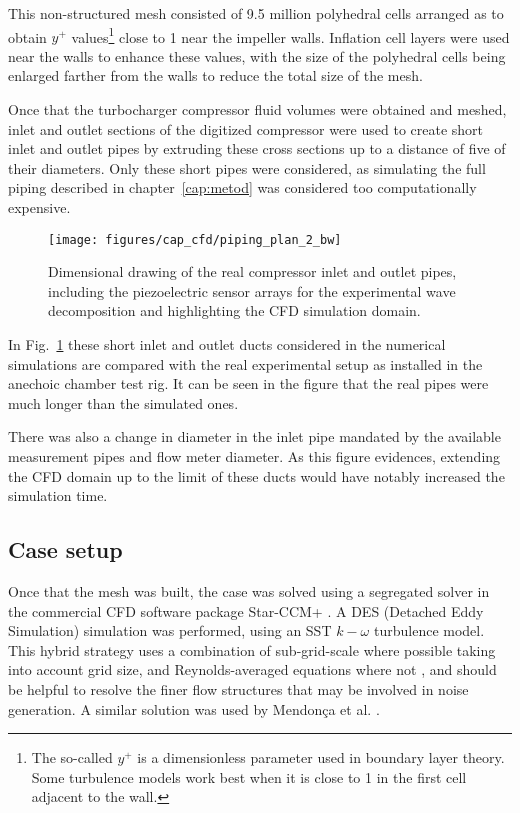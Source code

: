 This non-structured mesh consisted of 9.5 million polyhedral cells arranged as to obtain $y^+$ values\footnote{The so-called $y^+$ is a dimensionless parameter used in boundary layer theory. Some turbulence models work best when it is close to 1 in the first cell adjacent to the wall.} close to 1 near the impeller walls. Inflation cell layers were used near the walls to enhance these values, with the size of the polyhedral cells being enlarged farther from the walls to reduce the total size of the mesh.

Once that the turbocharger compressor fluid volumes were obtained and meshed, inlet and outlet sections of the digitized compressor were used to create short inlet and outlet pipes by extruding these cross sections up to a distance of five of their diameters. Only these short pipes were considered, as simulating the full piping described in chapter~\ref{cap:metod} was considered too computationally expensive. 

\begin{figure}
\centering
\texttt{[image: figures/cap\_cfd/piping\_plan\_2\_bw]}
\caption[Dimensional drawing of the compressor inlet and outlet pipes]{Dimensional drawing of the real compressor inlet and outlet pipes, including the piezoelectric sensor arrays for the experimental wave decomposition and highlighting the CFD simulation domain.}
\label{fig:cfd_piping_plan}
\end{figure}

In Fig.~\ref{fig:cfd_piping_plan} these short inlet and outlet ducts considered in the numerical simulations are compared with the real experimental setup as installed in the anechoic chamber test rig. It can be seen in the figure that the real pipes were much longer than the simulated ones. 

There was also a change in diameter in the inlet pipe mandated by the available measurement pipes and flow meter diameter. As this figure evidences, extending the CFD domain up to the limit of these ducts would have notably increased the simulation time.

\subsection{Case setup}

Once that the mesh was built, the case was solved using a segregated solver in the commercial CFD software package Star-CCM+ \cite{starccm}. A DES (Detached Eddy Simulation) simulation was performed, using an SST $k-\omega$ turbulence model. This hybrid strategy \cite{shur2008hybrid} uses a combination of sub-grid-scale where possible taking into account grid size, and Reynolds-averaged equations where not \cite{travin2000detached}, and should be helpful to resolve the finer flow structures that may be involved in noise generation. A similar solution was used by Mendonça et al. \cite{baris2011automotive,mendonca2012simulation}.

